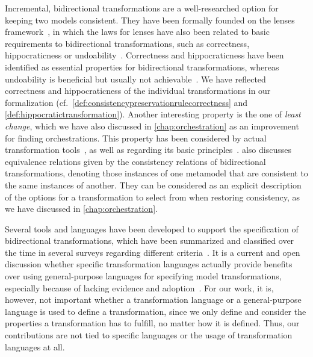 Incremental, bidirectional transformations are a well-researched option for keeping two models consistent.
They have been formally founded on the lenses framework~\cite{stevens2008bxalgebraic-ICGT}, in which the laws for lenses have also been related to basic requirements to bidirectional transformations, such as correctness, hippocraticness or undoability~\cite{stevens2010sosym}.
Correctness and hippocraticness have been identified as essential properties for bidirectional transformations, whereas undoability is beneficial but usually not achievable~\cite{stevens2010sosym}.
We have reflected correctness and hippocraticness of the individual transformations in our formalization (cf.\ \autoref{def:consistencypreservationrulecorrectness} and \autoref{def:hippocratictransformation}).
Another interesting property is the one of \emph{least change}, which we have also discussed in \autoref{chap:orchestration} as an improvement for finding orchestrations.
This property has been considered by actual transformation tools~\cite{macedo2016qvtAtlAlloy-SoSym}, as well as regarding its basic principles~\cite{cheney2017LeastChangeBx-JOT}.
\textcite{stevens2012equivalences-EASST} also discusses equivalence relations given by the consistency relations of bidirectional transformations, denoting those instances of one metamodel that are consistent to the same instances of another.
They can be considered as an explicit description of the options for a transformation to select from when restoring consistency, as we have discussed in \autoref{chap:orchestration}.

Several tools and languages have been developed to support the specification of bidirectional transformations, which have been summarized and classified over the time in several surveys regarding different criteria~\cite{stevens2008LandscapeBidirectionalTransformation-GTTSE, diRuscio2012transformations-SFM, etzlstorfer2013SurveyIncrementalTransformation-ME, jakumeit2014transformationTools-SCP, samimi-dehkordi2015bidirectionalSynchronization-ICCKE, samimi-dehkordi2016iccke,hidaka2016classificationTransformations-SoSym,kahani2019SurveyTransformationTools-SoSym}.
It is a current and open discussion whether specific transformation languages actually provide benefits over using general-purpose languages for specifying model transformations, especially because of lacking evidence and adoption~\cite{burgueno2019futureTransformationLanguages-ICMT}. 
For our work, it is, however, not important whether a transformation language or a general-purpose language is used to define a transformation, since we only define and consider the properties a transformation has to fulfill, no matter how it is defined.
Thus, our contributions are not tied to specific languages or the usage of transformation languages at all.

